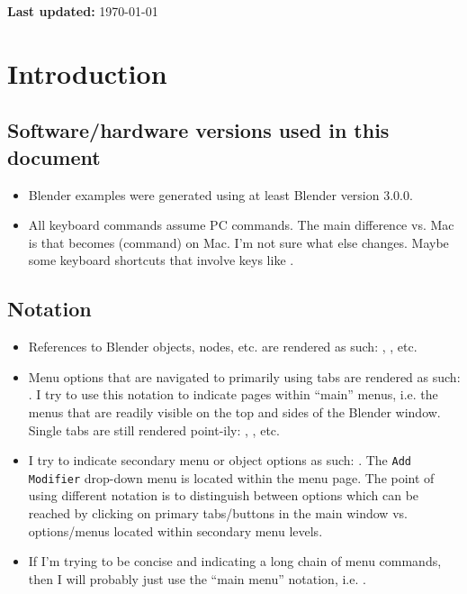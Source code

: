 \documentclass[10pt]{article}
\newcommand{\Menu}[2][]{\begingroup%
\tikzset{menu hack/.cd,#1}%
\menu{#2}%
\endgroup}
\newcommand{\obj}[1]{\menu{\color{magenta} #1}}
\begin{document}
{\bf Last updated:} \today

\tableofcontents

\newpage

\section*{Introduction}

\subsection{Software/hardware versions used in this document}
\begin{itemize}
    \item Blender examples were generated using at least Blender version 3.0.0.
    \item All keyboard commands assume PC commands. The main difference vs. Mac is that \keys{\ctrl} becomes \keys{\cmd} (command) on Mac. I'm not sure what else changes. Maybe some keyboard shortcuts that involve keys like .
\end{itemize}

\subsection{Notation}
\begin{itemize}
    \item References to Blender objects, nodes, etc. are rendered as such: \obj{Curve}, \obj{Camera}, etc.
    \item Menu options that are navigated to primarily using tabs are rendered as such: . I try to use this notation to indicate pages within ``main'' menus, i.e. the menus that are readily visible on the top and sides of the Blender window. Single tabs are still rendered point-ily: \Menu[t>]{Properties}, \Menu[t>]{Object}, etc.
    \item I try to indicate secondary menu or object options as such: . The {\tt Add Modifier} drop-down menu is located within the  menu page. The point of using different notation is to distinguish between options which can be reached by clicking on primary tabs/buttons in the main window vs. options/menus located within secondary menu levels.
    \item If I'm trying to be concise and indicating a long chain of menu commands, then I will probably just use the ``main menu'' notation, i.e. . 
\end{itemize}
\end{document}
